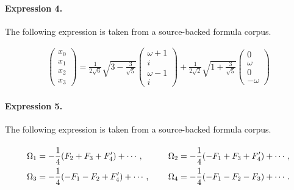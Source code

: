 \documentclass[11pt]{article}
\begin{document}
\paragraph{Expression 4.} The following expression is taken from a source-backed formula corpus.

\begin{align*}\left( \begin{array}{c} x_0 \\ x_1 \\ x_2 \\ x_3 \end{array} \right) = \frac{1}{2\sqrt{6}}\sqrt{3-\frac{3}{\sqrt{5}}} \left ( \begin{array}{c} \omega+1 \\ i \\ \omega-1 \\ i \end{array} \right) + \frac{1}{2\sqrt{2}}\sqrt{1+\frac{3}{\sqrt{5}}} \left ( \begin{array}{c} 0 \\ \omega \\ 0 \\ -\omega \end{array} \right)\end{align*}

\paragraph{Expression 5.} The following expression is taken from a source-backed formula corpus.

\begin{align*}\renewcommand{\arraystretch}{2} \begin{array}{lcl}\displaystyle \Omega_1 = -\frac{1}{4}(F_2+F_3+F'_4)+\cdots, & ~ &\displaystyle \Omega_2 = -\frac{1}{4}(-F_1+F_3+F'_4)+\cdots, \\\displaystyle \Omega_3 = -\frac{1}{4}(-F_1-F_2+F'_4)+\cdots, & ~ &\displaystyle \Omega_4 = -\frac{1}{4}(-F_1-F_2-F_3)+\cdots. \end{array}\end{align*}
\end{document}
